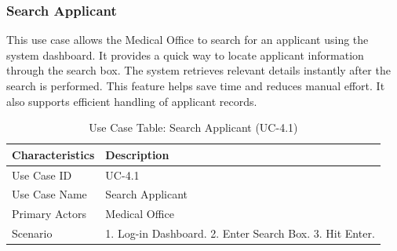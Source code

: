 \subsubsection{Search Applicant}
This use case allows the Medical Office to search for an applicant using the system dashboard. It provides a quick way to locate applicant information through the search box. The system retrieves relevant details instantly after the search is performed. This feature helps save time and reduces manual effort. It also supports efficient handling of applicant records.
\begin{table}[H]
    \centering
    \small
    \renewcommand{\arraystretch}{1.4}
    \caption{Use Case Table: Search Applicant (UC-4.1)} %
    \label{tab:search-applicant-medical}
    \begin{tabularx}{\textwidth}{|l|X|}
        \hline
        \rowcolor[gray]{0.9} {Characteristics} & {Description} \\ \hline
        Use Case ID & UC-4.1 \\ \hline
        Use Case Name & Search Applicant \\ \hline
        Primary Actors & Medical Office \\ \hline
        Scenario & 1. Log-in Dashboard. 2. Enter Search Box. 3. Hit Enter. \\ \hline
    \end{tabularx}
\end{table}
\FloatBarrier